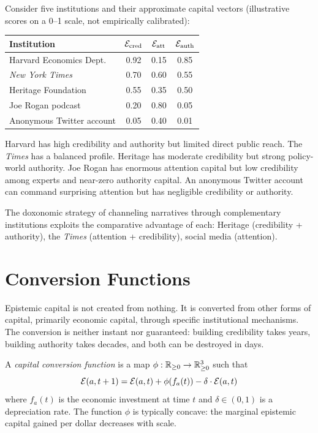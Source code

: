\begin{example}
\label{ex:profiles}
Consider five institutions and their approximate capital vectors (illustrative scores on a 0--1 scale, not empirically calibrated):

\begin{center}
\begin{tabular}{lccc}
\toprule
\textbf{Institution} & $\mathcal{E}_{\text{cred}}$ & $\mathcal{E}_{\text{att}}$ & $\mathcal{E}_{\text{auth}}$ \\
\midrule
Harvard Economics Dept. & 0.92 & 0.15 & 0.85 \\
\textit{New York Times} & 0.70 & 0.60 & 0.55 \\
Heritage Foundation & 0.55 & 0.35 & 0.50 \\
Joe Rogan podcast & 0.20 & 0.80 & 0.05 \\
Anonymous Twitter account & 0.05 & 0.40 & 0.01 \\
\bottomrule
\end{tabular}
\end{center}

Harvard has high credibility and authority but limited direct public reach.
The \textit{Times} has a balanced profile.
Heritage has moderate credibility but strong policy-world authority.
Joe Rogan has enormous attention capital but low credibility among experts and near-zero authority capital.
An anonymous Twitter account can command surprising attention but has negligible credibility or authority.

The doxonomic strategy of channeling narratives through complementary institutions exploits the comparative advantage of each: Heritage (credibility + authority), the \textit{Times} (attention + credibility), social media (attention).
\end{example}


\section{Conversion Functions}
\label{sec:ch6-conversion}

Epistemic capital is not created from nothing.
It is converted from other forms of capital, primarily economic capital, through specific institutional mechanisms.
The conversion is neither instant nor guaranteed: building credibility takes years, building authority takes decades, and both can be destroyed in days.

\begin{definition}
\label{def:conversion}
A \emph{capital conversion function} is a map $\phi: \mathbb{R}_{\geq 0} \to \mathbb{R}_{\geq 0}^3$ such that
\[
  \mathcal{E}(a, t+1) = \mathcal{E}(a, t) + \phi(f_a(t)) - \delta \cdot \mathcal{E}(a, t)
\]
where $f_a(t)$ is the economic investment at time $t$ and $\delta \in (0,1)$ is a depreciation rate.
The function $\phi$ is typically concave: the marginal epistemic capital gained per dollar decreases with scale.
\end{definition}

